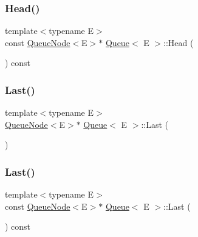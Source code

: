 \subsubsection{\texorpdfstring{Head()}{Head()}\hspace{0.1cm}{\footnotesize\ttfamily [2/2]}}
{\footnotesize\ttfamily template$<$typename E$>$ \\
const \hyperlink{class_queue_node}{Queue\+Node}$<$E$>$$\ast$ \hyperlink{class_queue}{Queue}$<$ E $>$\+::Head (\begin{DoxyParamCaption}{ }\end{DoxyParamCaption}) const\hspace{0.3cm}{\ttfamily [inline]}}

\mbox{\label{class_queue_a430aca3d3b9f5fd588b215028d134b74}} 
\subsubsection{\texorpdfstring{Last()}{Last()}\hspace{0.1cm}{\footnotesize\ttfamily [1/2]}}
{\footnotesize\ttfamily template$<$typename E$>$ \\
\hyperlink{class_queue_node}{Queue\+Node}$<$E$>$$\ast$ \hyperlink{class_queue}{Queue}$<$ E $>$\+::Last (\begin{DoxyParamCaption}{ }\end{DoxyParamCaption})\hspace{0.3cm}{\ttfamily [inline]}}

\mbox{\label{class_queue_a7c8c2c64700dfe1df8bf266572cf101a}} 
\subsubsection{\texorpdfstring{Last()}{Last()}\hspace{0.1cm}{\footnotesize\ttfamily [2/2]}}
{\footnotesize\ttfamily template$<$typename E$>$ \\
const \hyperlink{class_queue_node}{Queue\+Node}$<$E$>$$\ast$ \hyperlink{class_queue}{Queue}$<$ E $>$\+::Last (\begin{DoxyParamCaption}{ }\end{DoxyParamCaption}) const\hspace{0.3cm}{\ttfamily [inline]}}

